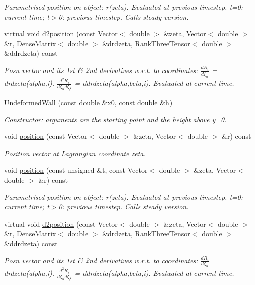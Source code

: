 \begin{DoxyCompactItemize}
\begin{DoxyCompactList}\small\item\em Parametrised position on object\+: r(zeta). Evaluated at previous timestep. t=0\+: current time; t$>$0\+: previous timestep. Calls steady version. \end{DoxyCompactList}\item 
virtual void \hyperlink{classUndeformedWall_a709e65fc95e9443a886125e455595e5d}{d2position} (const Vector$<$ double $>$ \&zeta, Vector$<$ double $>$ \&r, Dense\+Matrix$<$ double $>$ \&drdzeta, Rank\+Three\+Tensor$<$ double $>$ \&ddrdzeta) const
\begin{DoxyCompactList}\small\item\em Posn vector and its 1st \& 2nd derivatives w.\+r.\+t. to coordinates\+: $ \frac{dR_i}{d \zeta_\alpha}$ = drdzeta(alpha,i). $ \frac{d^2R_i}{d \zeta_\alpha d \zeta_\beta}$ = ddrdzeta(alpha,beta,i). Evaluated at current time. \end{DoxyCompactList}\item 
\hyperlink{classUndeformedWall_ad09cfdcd234be0ab47eb97a8a470602a}{Undeformed\+Wall} (const double \&x0, const double \&h)
\begin{DoxyCompactList}\small\item\em Constructor\+: arguments are the starting point and the height above y=0. \end{DoxyCompactList}\item 
void \hyperlink{classUndeformedWall_ab0410681e2096091319a79e79937cba3}{position} (const Vector$<$ double $>$ \&zeta, Vector$<$ double $>$ \&r) const
\begin{DoxyCompactList}\small\item\em Position vector at Lagrangian coordinate zeta. \end{DoxyCompactList}\item 
void \hyperlink{classUndeformedWall_a9cbb52e30fd47d1841c1c3dc812f4b96}{position} (const unsigned \&t, const Vector$<$ double $>$ \&zeta, Vector$<$ double $>$ \&r) const
\begin{DoxyCompactList}\small\item\em Parametrised position on object\+: r(zeta). Evaluated at previous timestep. t=0\+: current time; t$>$0\+: previous timestep. Calls steady version. \end{DoxyCompactList}\item 
virtual void \hyperlink{classUndeformedWall_a709e65fc95e9443a886125e455595e5d}{d2position} (const Vector$<$ double $>$ \&zeta, Vector$<$ double $>$ \&r, Dense\+Matrix$<$ double $>$ \&drdzeta, Rank\+Three\+Tensor$<$ double $>$ \&ddrdzeta) const
\begin{DoxyCompactList}\small\item\em Posn vector and its 1st \& 2nd derivatives w.\+r.\+t. to coordinates\+: $ \frac{dR_i}{d \zeta_\alpha}$ = drdzeta(alpha,i). $ \frac{d^2R_i}{d \zeta_\alpha d \zeta_\beta}$ = ddrdzeta(alpha,beta,i). Evaluated at current time. \end{DoxyCompactList}\end{DoxyCompactItemize}

